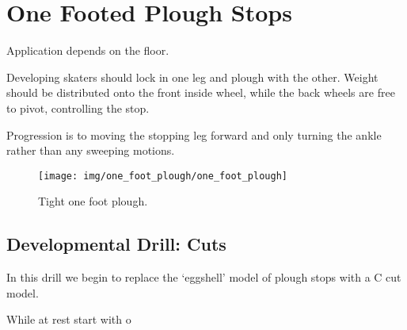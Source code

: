 \section{One Footed Plough Stops}
\label{sec:stopping/plough_one_foot}

Application depends on the floor.

Developing skaters should lock in one leg and plough with the other. 
Weight should be distributed onto the front inside wheel, while the back wheels are free to pivot, controlling the stop. 

Progression is to moving the stopping leg forward and only turning the ankle rather than any sweeping motions. 



\begin{figure}
\centering
\texttt{[image: img/one\_foot\_plough/one\_foot\_plough]}
\caption{Tight one foot plough.}
\end{figure}



\subsection{Developmental Drill: Cuts}
\label{sec:stopping/plough_one_foot/cuts}

In this drill we begin to replace the `eggshell' model of plough stops with a C cut model. 

While at rest start with o  


